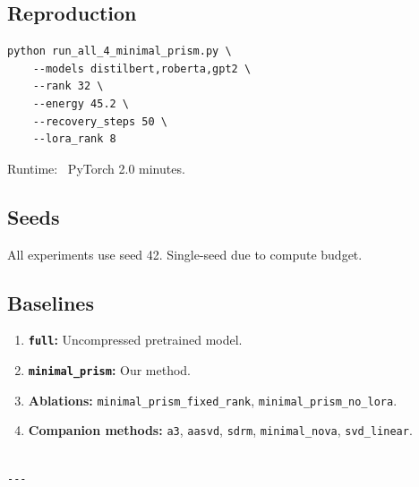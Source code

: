 \subsection{Reproduction}

\begin{lstlisting}
python run_all_4_minimal_prism.py \
    --models distilbert,roberta,gpt2 \
    --rank 32 \
    --energy 45.2 \
    --recovery_steps 50 \
    --lora_rank 8
\end{lstlisting}

Runtime: ~PyTorch 2.0 minutes.

\subsection{Seeds}

All experiments use seed 42. Single-seed due to compute budget.

\subsection{Baselines}

\begin{enumerate}
\item \textbf{\texttt{full}:} Uncompressed pretrained model.
\item \textbf{\texttt{minimal\_prism}:} Our method.
\item \textbf{Ablations:} \texttt{minimal\_prism\_fixed\_rank}, \texttt{minimal\_prism\_no\_lora}.
\item \textbf{Companion methods:} \texttt{a3}, \texttt{aasvd}, \texttt{sdrm}, \texttt{minimal\_nova}, \texttt{svd\_linear}.
\end{enumerate}
\begin{lstlisting}

---
\end{lstlisting}